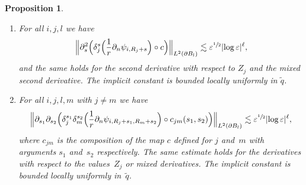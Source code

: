 \documentclass[JEP,XML,SOM,Unicode,published]{cedram}
\let\epsilon\varepsilon
\newtheorem{proposition}[theorem]{Proposition}
\theoremstyle{definition}
\newcommand\Bnorm[1]{\Bigl\lVert #1\Bigr\rVert}
\let\de\partial
\let\eps\epsilon
\begin{document}
\skpt
\begin{proposition}\label{2nd deri mu}
\begin{enumerate}
\item\label{2nd deri mua}
For all $i,j,l$ we have
\begin{align*}
\Bnorm{\de_s^2\Bigl(\delta_j^s \Bigl(\frac{1}{r}\de_n\psi_{i,R_j+s} \Bigr)\circ c \Bigr)}_{L^2(\de B_l)}\lesssim \eps^{\sfrac{1}{2}}|{\log\eps}|^\ell,
\end{align*}
and the same holds for the second derivative with respect to $Z_j$ and the mixed second derivative. The implicit constant is bounded locally uniformly in $\tilde{q}$.
\item\label{2nd deri mub}
For all $i,j,l,m$ with $j\neq m$ we have
\begin{align*}
\Bnorm{\de_{s_1}\de_{s_2} \Bigl(\delta_j^{s_1}\delta_m^{s_2} \Bigl(\frac{1}{r}\de_n\psi_{i,R_j+s_1,R_m+s_2} \Bigr)\circ c_{jm}(s_1,s_2) \Bigr)}_{L^2(\de B_l)}\lesssim \eps^{\sfrac{1}{2}}|{\log\eps}|^\ell,
\end{align*}
where $c_{jm}$ is the composition of the map $c$ defined for $j$ and~$m$ with arguments $s_1$ and~$s_2$ respectively. The same estimate holds for the derivatives with respect to the values~$Z_j$ or mixed derivatives. The implicit constant is bounded locally uniformly in~$\tilde{q}$.
\end{enumerate}
\end{proposition}
\end{document}
